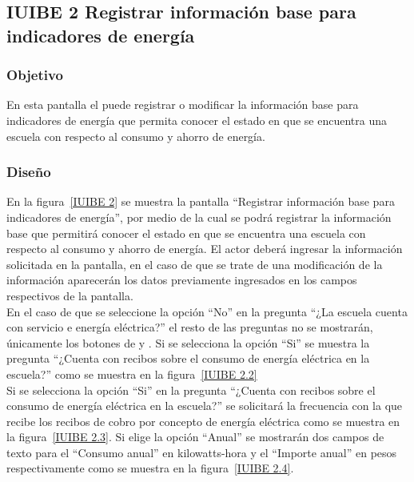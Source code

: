 \subsection{IUIBE 2 Registrar información base para indicadores de energía}

\subsubsection{Objetivo}

      En esta pantalla el  puede registrar o modificar la información base para indicadores de energía que permita conocer el estado en que se encuentra una escuela con respecto al consumo y ahorro de energía.

\subsubsection{Diseño}

    En la figura~\ref{IUIBE 2} se muestra la pantalla ``Registrar información base para indicadores de energía'', por medio de la cual se podrá registrar la información base que permitirá conocer el estado en que se encuentra una escuela con respecto al consumo y ahorro de energía. El actor deberá ingresar la información solicitada en la pantalla, en el caso de que se trate de una modificación de la información aparecerán los datos previamente ingresados en los campos respectivos de la pantalla.\\
    
    En el caso de que se seleccione la opción ``No'' en la pregunta ``¿La escuela cuenta con servicio e energía eléctrica?'' el resto de las preguntas no se mostrarán, únicamente los botones de  y . Si se selecciona la opción ``Si'' se muestra la pregunta ``¿Cuenta con recibos sobre el consumo de energía eléctrica en la escuela?'' como se muestra en la figura~\ref{IUIBE 2.2}\\
    
    Si se selecciona la opción ``Si'' en la pregunta ``¿Cuenta con recibos sobre el consumo de energía eléctrica en la escuela?'' se solicitará la frecuencia con la que recibe los recibos de cobro por concepto de energía eléctrica como se muestra en la figura~\ref{IUIBE 2.3}. Si elige la opción ``Anual'' se mostrarán dos campos de texto para el ``Consumo anual'' en kilowatts-hora y el ``Importe anual'' en pesos respectivamente como se muestra en la figura~\ref{IUIBE 2.4}.\\
    
